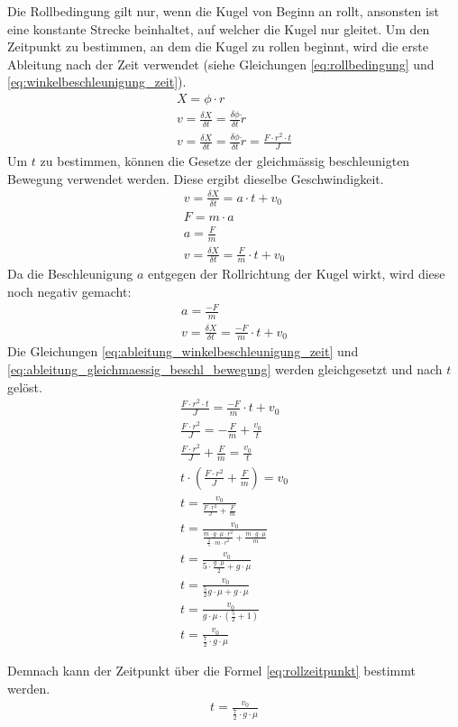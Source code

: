 Die Rollbedingung gilt nur, wenn die Kugel von Beginn an rollt, ansonsten ist eine konstante Strecke beinhaltet,
auf welcher die Kugel nur gleitet\cite{rollzeitpunkt}. Um den Zeitpunkt zu bestimmen, an dem die Kugel zu rollen
beginnt, wird die erste Ableitung nach der Zeit verwendet (siehe Gleichungen \ref{eq:rollbedingung} und \ref{eq:winkelbeschleunigung_zeit}).
\begin{align}
    X = \phi \cdot r\\
    v = \frac{\delta X}{\delta t} = \frac{\delta \phi}{\delta t} \dot r\\
    v = \frac{\delta X}{\delta t} = \frac{\delta \phi}{\delta t} \dot r = \frac{F \cdot r^2 \cdot t}{J}\label{eq:ableitung_winkelbeschleunigung_zeit}
\end{align}
Um $t$ zu bestimmen, können die Gesetze der gleichmässig beschleunigten Bewegung verwendet werden. Diese ergibt dieselbe Geschwindigkeit.
\begin{align}
    v = \frac{\delta X}{\delta t} = a \cdot t + v_0\\
    F = m \cdot a\\
    a = \frac{F}{m}\\
    v = \frac{\delta X}{\delta t} = \frac{F}{m} \cdot t + v_0
\end{align}
Da die Beschleunigung $a$ entgegen der Rollrichtung der Kugel wirkt, wird diese noch negativ gemacht:
\begin{align}
    a = \frac{-F}{m}\\
    v = \frac{\delta X}{\delta t} = \frac{-F}{m} \cdot t + v_0\label{eq:ableitung_gleichmaessig_beschl_bewegung}
\end{align}
Die Gleichungen \ref{eq:ableitung_winkelbeschleunigung_zeit} und \ref{eq:ableitung_gleichmaessig_beschl_bewegung} werden gleichgesetzt und nach $t$ gelöst.
\begin{align}
    \frac{F \cdot r^2 \cdot t}{J} = \frac{-F}{m} \cdot t + v_0\\
    \frac{F \cdot r^2}{J} = -\frac{F}{m} + \frac{v_0}{t}\\
    \frac{F \cdot r^2}{J} + \frac{F}{m} = \frac{v_0}{t}\\
    t \cdot (\frac{F \cdot r^2}{J} + \frac{F}{m}) = v_0\\
    t = \frac{v_0}{\frac{F \cdot r^2}{J} + \frac{F}{m}}\\
    t = \frac{v_0}{\frac{m \cdot g \cdot \mu \cdot r^2}{\frac{2}{5} \cdot m \cdot r^2} + \frac{m \cdot g \cdot \mu}{m}}\\
    t = \frac{v_0}{5 \cdot \frac{g \cdot \mu}{2} + g \cdot \mu}\\
    t = \frac{v_0}{\frac{5}{2} g \cdot \mu + g \cdot \mu}\\
    t = \frac{v_0}{g \cdot \mu \cdot (\frac{5}{2} + 1)}\\
    t = \frac{v_0}{\frac{7}{2} \cdot g \cdot \mu}
\end{align}

Demnach kann der Zeitpunkt über die Formel \ref{eq:rollzeitpunkt} bestimmt werden.
\begin{align}
    t = \frac{v_0}{\frac{7}{2} \cdot g \cdot \mu}\label{eq:rollzeitpunkt}
\end{align}